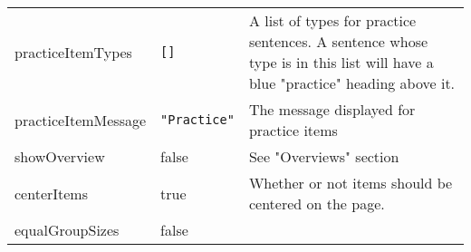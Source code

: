 \documentclass[
]{article}
\begin{document}
\begin{RaggedRight}
\begin{longtable}[]{p{1.7in}p{1in}p{3.15in}}
\begin{minipage}[t]{0.26\columnwidth}\raggedright
practiceItemTypes\strut
\end{minipage} & \begin{minipage}[t]{0.28\columnwidth}\raggedright
\texttt{{[}{]}}\strut
\end{minipage} & \begin{minipage}[t]{0.37\columnwidth}\raggedright
A list of types for practice sentences. A sentence whose type is in this
list will have a blue "practice" heading above it.\strut
\end{minipage}\tabularnewline
\begin{minipage}[t]{0.26\columnwidth}\raggedright
practiceItemMessage\strut
\end{minipage} & \begin{minipage}[t]{0.28\columnwidth}\raggedright
\texttt{"Practice"}\strut
\end{minipage} & \begin{minipage}[t]{0.37\columnwidth}\raggedright
The message displayed for practice items\strut
\end{minipage}\tabularnewline
\begin{minipage}[t]{0.26\columnwidth}\raggedright
showOverview\strut
\end{minipage} & \begin{minipage}[t]{0.28\columnwidth}\raggedright
false\strut
\end{minipage} & \begin{minipage}[t]{0.37\columnwidth}\raggedright
See "Overviews" section\strut
\end{minipage}\tabularnewline
\begin{minipage}[t]{0.26\columnwidth}\raggedright
centerItems\strut
\end{minipage} & \begin{minipage}[t]{0.28\columnwidth}\raggedright
true\strut
\end{minipage} & \begin{minipage}[t]{0.37\columnwidth}\raggedright
Whether or not items should be centered on the page.\strut
\end{minipage}\tabularnewline
\begin{minipage}[t]{0.26\columnwidth}\raggedright
equalGroupSizes\strut
\end{minipage} & \begin{minipage}[t]{0.28\columnwidth}\raggedright
false\strut
\end{minipage} & \begin{minipage}[t]{0.37\columnwidth}\raggedright

\end{minipage}
\end{longtable}
\end{RaggedRight}
\end{document}
